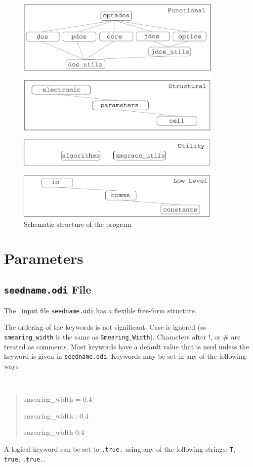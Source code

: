 \documentclass[a4paper,11pt,twoside]{book}
\begin{document}
{\begin{figure}
\begin{center}
\includegraphics*[width=100mm]{./images/block_diag.eps}
\caption{Schematic structure of the program} \label{fig:prog_structure}
\end{center}
\end{figure}

\chapter{Parameters}\label{chap:parameters}

\section{{\tt seedname.odi} File}
The \optados\ input file {\tt seedname.odi} has a flexible free-form
structure.

The ordering of the keywords is not significant. Case is ignored (so
\verb#smearing_width# is the same as \verb#Smearing_Width#). Characters after !, or \#
are treated as comments. Most keywords have a default value that is
used unless the keyword is given in {\tt seedname.odi}. Keywords may be set
in any of the following ways
{\tt
\begin{quote}
smearing\_width = 0.4

smearing\_width : 0.4

smearing\_width   0.4
\end{quote} }
A logical keyword can be set to {\tt .true.} using any of the following
strings: {\tt T}, {\tt true}, {\tt .true.}.


}
\end{document}
